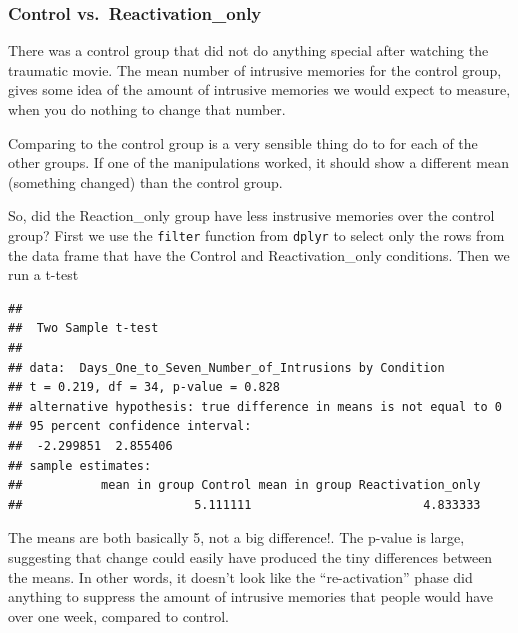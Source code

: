 \documentclass[]{book}
\newenvironment{Shaded}{\begin{snugshade}}{\end{snugshade}}
\newcommand{\KeywordTok}[1]{\textcolor[rgb]{0.13,0.29,0.53}{\textbf{{#1}}}}
\newcommand{\DataTypeTok}[1]{\textcolor[rgb]{0.13,0.29,0.53}{{#1}}}
\newcommand{\StringTok}[1]{\textcolor[rgb]{0.31,0.60,0.02}{{#1}}}
\newcommand{\OtherTok}[1]{\textcolor[rgb]{0.56,0.35,0.01}{{#1}}}
\newcommand{\NormalTok}[1]{{#1}}
\theoremstyle{definition}
\theoremstyle{definition}
\theoremstyle{definition}
\theoremstyle{remark}
\begin{document}
\subsubsection{Control
vs.~Reactivation\_only}\label{control-vs.reactivation_only}

There was a control group that did not do anything special after
watching the traumatic movie. The mean number of intrusive memories for
the control group, gives some idea of the amount of intrusive memories
we would expect to measure, when you do nothing to change that number.

Comparing to the control group is a very sensible thing do to for each
of the other groups. If one of the manipulations worked, it should show
a different mean (something changed) than the control group.

So, did the Reaction\_only group have less instrusive memories over the
control group? First we use the \texttt{filter} function from
\texttt{dplyr} to select only the rows from the data frame that have the
Control and Reactivation\_only conditions. Then we run a t-test

\begin{Shaded}
\end{Shaded}

\begin{verbatim}
## 
##  Two Sample t-test
## 
## data:  Days_One_to_Seven_Number_of_Intrusions by Condition
## t = 0.219, df = 34, p-value = 0.828
## alternative hypothesis: true difference in means is not equal to 0
## 95 percent confidence interval:
##  -2.299851  2.855406
## sample estimates:
##           mean in group Control mean in group Reactivation_only 
##                        5.111111                        4.833333
\end{verbatim}

The means are both basically 5, not a big difference!. The p-value is
large, suggesting that change could easily have produced the tiny
differences between the means. In other words, it doesn't look like the
``re-activation'' phase did anything to suppress the amount of intrusive
memories that people would have over one week, compared to control.
\end{document}
